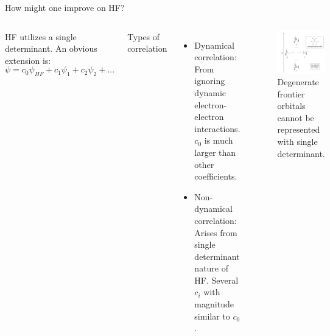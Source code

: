 \documentclass[aspectratio=169]{beamer}
\begin{document}
\begin{frame}{How might one improve on HF?}
\begin{columns}
    
    HF utilizes a single determinant. An obvious extension is:
    \begin{equation*}
        \psi = c_0 \psi_{HF} + c_1 \psi_{1} + c_2\psi_{2} + ...
    \end{equation*}

Types of correlation
\begin{itemize}
    \item Dynamical correlation: From ignoring dynamic electron-electron interactions. $c_0$ is much larger than other coefficients.
    \item Non-dynamical correlation: Arises from single determinant nature of HF. Several $c_i$ with magnitude similar to $c_0$.
\end{itemize}
\begin{figure}
    \centering
    \includegraphics[width=0.7\linewidth]{lectures/figures/3_degenerate_orbitals.png}
    \caption{Degenerate frontier orbitals cannot be represented with single determinant.}
\end{figure}
\end{columns}

\end{frame}
\end{document}
